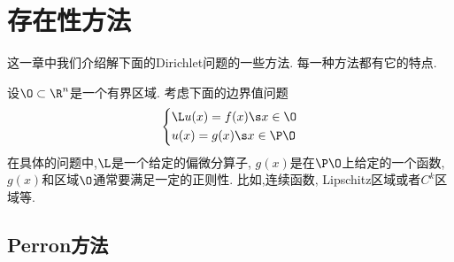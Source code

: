 \chapter{存在性方法}
这一章中我们介绍解下面的Dirichlet问题的一些方法. 每一种方法都有它的特点.
\par 设$\O\subset \R^n$是一个有界区域. 考虑下面的边界值问题
\begin{equation}
    \left\{
        \begin{aligned}
            &\L u(x) = f(x) \s x \in \O \\
            &u(x)=g(x) \s x \in \P \O
        \end{aligned}
    \right.
\end{equation}
在具体的问题中,$\L$是一个给定的偏微分算子,  $g(x)$是在$\P \O$上给定的一个函数, $g(x)$和区域$\O$通常要满足一定的正则性. 比如,连续函数, Lipschitz区域或者$C^k$区域等. 
\ifdefined \noperron
\else
\section{Perron方法}
